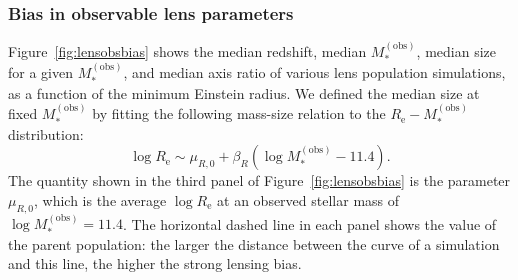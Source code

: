 \documentclass{aa}
\def\reff{R_{\mathrm{e}}}
\def\mobs{M_*^{(\mathrm{obs})}}
\def\Fref#1{Figure~\ref{#1}\xspace}
\begin{document}
\subsubsection{Bias in observable lens parameters}

\Fref{fig:lensobsbias} shows the median redshift, median $\mobs$, median size for a given $\mobs$, and median axis ratio of various lens population simulations, as a function of the minimum Einstein radius.
We defined the median size at fixed $\mobs$ by fitting the following mass-size relation to the $\reff-\mobs$ distribution:
\begin{equation}
\log{\reff} \sim \mu_{R,0} + \beta_R(\log{\mobs} - 11.4).
\end{equation}
The quantity shown in the third panel of \Fref{fig:lensobsbias} is the parameter $\mu_{R,0}$, which is the average $\log{\reff}$ at an observed stellar mass of $\log{\mobs}=11.4$.
The horizontal dashed line in each panel shows the value of the parent population: the larger the distance between the curve of a simulation and this line, the higher the strong lensing bias.
\end{document}
